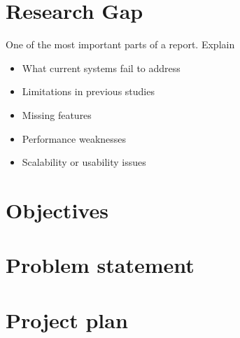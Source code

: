\section{Research Gap}
\label{sec:research-gap}
One of the most important parts of a report. Explain
\begin{itemize}
	\item What current systems fail to address
	\item Limitations in previous studies
	\item Missing features
	\item Performance weaknesses
	\item Scalability or usability issues
\end{itemize}

\paragraph{}

\section{Objectives}
\label{sec:objectives}
\paragraph{}

\section{Problem statement}
\label{sec:problem-statement}
\paragraph{}

\section{Project plan}
\label{sec:project-plan}
\paragraph{}

